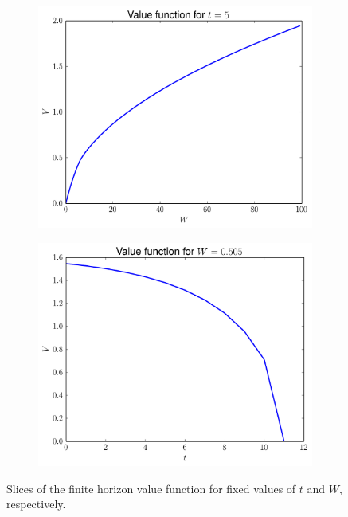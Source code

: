 \begin{figure}
\begin{subfigure}{.5\textwidth}
    \includegraphics[width=\textwidth]{fixed_time.pdf}
\end{subfigure}
\begin{subfigure}{.5\textwidth}
    \includegraphics[width=\textwidth]{fixed_w.pdf}
\end{subfigure}
\caption{Slices of the finite horizon value function for fixed values of $t$ and $W$, respectively.}
\label{fig:valueslices}
\end{figure}

